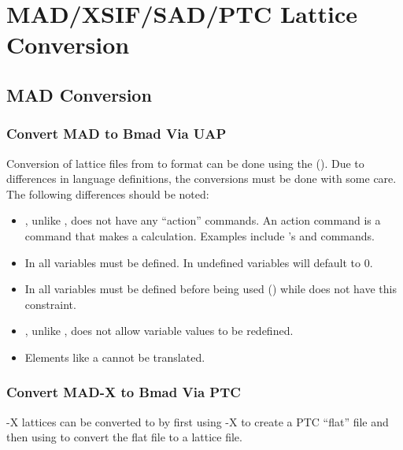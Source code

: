\chapter{MAD/XSIF/SAD/PTC Lattice Conversion}
\label{c:lat.convert}

\section{MAD Conversion}
\label{s:mad.convert}


\subsection{Convert MAD to Bmad Via UAP}
\label{s:mad.bmad.uap}

Conversion of lattice files from \mad to \bmad format can be done
using the  (). Due to
differences in language definitions, the conversions must be done with
some care. The following differences should be noted:
  \begin{itemize}
  \item
\bmad, unlike \mad, does not have any ``action'' commands. An action
command is a command that makes a calculation. Examples include \mad's
 and  commands.
  \item
In \bmad all variables must be defined. In \mad undefined variables
will default to 0.
  \item
In \bmad all variables must be defined before being used
() while \mad does not have this constraint.
  \item
\bmad, unlike \mad, does not allow variable values to be redefined.
  \item
Elements like a  cannot be translated.
  \end{itemize}

\subsection{Convert MAD-X to Bmad Via PTC}
\label{s:mad.bmad.ptc}

\mad-X lattices can be converted to \bmad by first using \mad-X to create a PTC ``flat''
file and then using \bmad to convert the flat file to a \bmad lattice file. 

